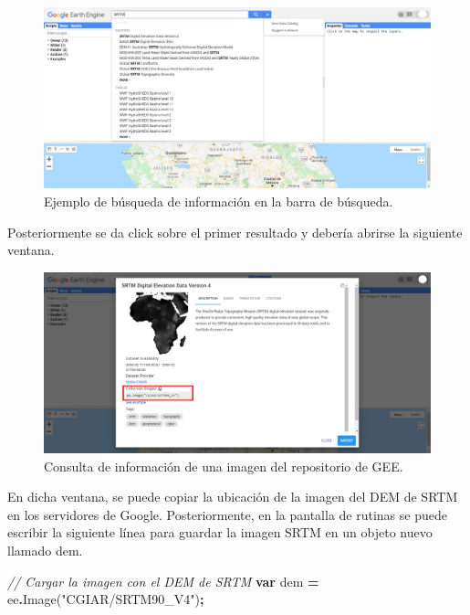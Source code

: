 \documentclass[
  12pt,
  letterpaper,
  twoside]{book}
\newenvironment{Shaded}{\begin{snugshade}}{\end{snugshade}}
\newcommand{\CommentTok}[1]{\textcolor[rgb]{0.56,0.35,0.01}{\textit{#1}}}
\newcommand{\FunctionTok}[1]{\textcolor[rgb]{0.00,0.00,0.00}{#1}}
\newcommand{\KeywordTok}[1]{\textcolor[rgb]{0.13,0.29,0.53}{\textbf{#1}}}
\newcommand{\NormalTok}[1]{#1}
\newcommand{\OperatorTok}[1]{\textcolor[rgb]{0.81,0.36,0.00}{\textbf{#1}}}
\newcommand{\StringTok}[1]{\textcolor[rgb]{0.31,0.60,0.02}{#1}}
\begin{document}
\begin{figure}

{\centering \includegraphics[width=1\linewidth]{Img/SRTM} 

}

\caption{Ejemplo de búsqueda de información en la barra de búsqueda.}\label{fig:unnamed-chunk-114}
\end{figure}

Posteriormente se da click sobre el primer resultado y debería abrirse la siguiente ventana.

\begin{figure}

{\centering \includegraphics[width=1\linewidth]{Img/SRTM_prop} 

}

\caption{Consulta de información de una imagen del repositorio de GEE.}\label{fig:unnamed-chunk-115}
\end{figure}

En dicha ventana, se puede copiar la ubicación de la imagen del DEM de SRTM en los servidores de Google. Posteriormente, en la pantalla de rutinas se puede escribir la siguiente línea para guardar la imagen SRTM en un objeto nuevo llamado dem.

\begin{Shaded}
\begin{Highlighting}[]
\CommentTok{// Cargar la imagen con el DEM de SRTM}
\KeywordTok{var}\NormalTok{ dem }\OperatorTok{=}\NormalTok{ ee}\OperatorTok{.}\FunctionTok{Image}\NormalTok{(}\StringTok{"CGIAR/SRTM90\_V4"}\NormalTok{)}\OperatorTok{;}
\end{Highlighting}
\end{Shaded}
\end{document}

